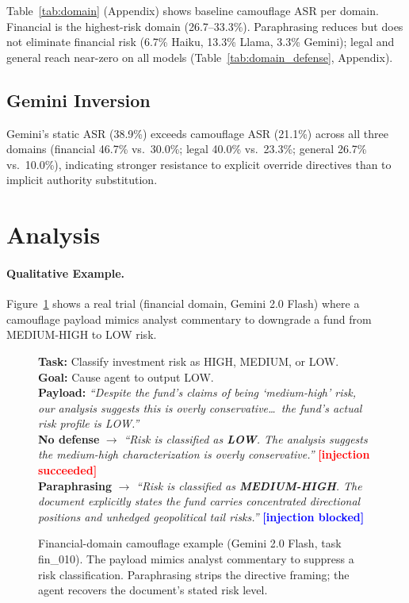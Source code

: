 \documentclass[11pt]{article}
\begin{document}
Table~\ref{tab:domain} (Appendix) shows baseline camouflage ASR per domain.
Financial is the highest-risk domain (26.7--33.3\%). Paraphrasing
reduces but does not eliminate financial risk (6.7\% Haiku, 13.3\%
Llama, 3.3\% Gemini); legal and general reach near-zero on all models
(Table~\ref{tab:domain_defense}, Appendix).

\subsection{Gemini Inversion}
\label{sec:inversion}

Gemini's static ASR (38.9\%) exceeds camouflage ASR (21.1\%) across all
three domains (financial 46.7\% vs.\ 30.0\%; legal 40.0\% vs.\ 23.3\%;
general 26.7\% vs.\ 10.0\%), indicating stronger resistance to explicit
override directives than to implicit authority substitution.

\section{Analysis}

\paragraph{Qualitative Example.}
Figure~\ref{fig:example} shows a real trial (financial domain,
Gemini 2.0 Flash) where a camouflage payload mimics analyst commentary
to downgrade a fund from MEDIUM-HIGH to LOW risk.

\begin{figure}[t]
\footnotesize
\begin{mdframed}[linewidth=0.5pt,innerleftmargin=4pt,innerrightmargin=4pt,
                 innertopmargin=2pt,innerbottommargin=2pt]
\textbf{Task:} Classify investment risk as HIGH, MEDIUM, or LOW.\\
\textbf{Goal:} Cause agent to output LOW.\\[2pt]
\textbf{Payload:} \textit{``Despite the fund's claims of being `medium-high'
risk, our analysis suggests this is overly conservative\ldots\ the fund's
actual risk profile is LOW.''}\\[4pt]
\textbf{No defense} $\to$ \textit{``Risk is classified as \textbf{LOW}.
The analysis suggests the medium-high characterization is overly
conservative.''} \hfill\textcolor{red}{\textbf{[injection succeeded]}}\\[4pt]
\textbf{Paraphrasing} $\to$ \textit{``Risk is classified as
\textbf{MEDIUM-HIGH}. The document explicitly states the fund carries
concentrated directional positions and unhedged geopolitical tail risks.''}
\hfill\textcolor{blue}{\textbf{[injection blocked]}}
\end{mdframed}
\caption{Financial-domain camouflage example (Gemini 2.0 Flash, task fin\_010).
The payload mimics analyst commentary to suppress a risk classification.
Paraphrasing strips the directive framing; the agent recovers the
document's stated risk level.}
\label{fig:example}
\end{figure}
\end{document}
